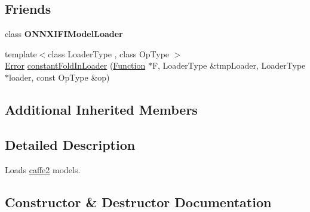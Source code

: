 \subsection*{Friends}
\begin{DoxyCompactItemize}
\item 
\mbox{\label{classglow_1_1_caffe2_model_loader_a2261b7d10ab59af231f02aaa75b7829a}} 
class {\bfseries O\+N\+N\+X\+I\+F\+I\+Model\+Loader}
\item 
{\footnotesize template$<$class Loader\+Type , class Op\+Type $>$ }\\\hyperlink{namespaceglow_afdb176c3a672ef66db0ecfc19a8d39bf}{Error} \hyperlink{classglow_1_1_caffe2_model_loader_a80921ed3db9c22615413812ec08923de}{constant\+Fold\+In\+Loader} (\hyperlink{classglow_1_1_function}{Function} $\ast$F, Loader\+Type \&tmp\+Loader, Loader\+Type $\ast$loader, const Op\+Type \&op)
\end{DoxyCompactItemize}
\subsection*{Additional Inherited Members}


\subsection{Detailed Description}
Loads \hyperlink{namespacecaffe2}{caffe2} models. 

\subsection{Constructor \& Destructor Documentation}
\mbox{\label{classglow_1_1_caffe2_model_loader_a1b5e4ecb2ee703dbb2656e953c7a6146}} 

